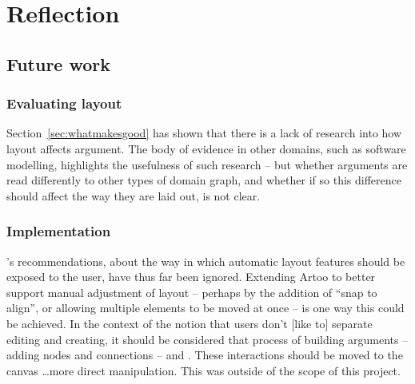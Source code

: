 \chapter{Reflection}


\section{Future work}

\subsection{Evaluating layout}

Section~\ref{sec:whatmakesgood} has shown that there is a lack of research into how layout affects argument. The body of evidence in other domains, such as software modelling, highlights the usefulness of such research -- but whether arguments are read differently to other types of domain graph, and whether if so this difference should affect the way they are laid out, is not clear.



\subsection{Implementation}

\citet{5674033}'s recommendations, about the way in which automatic layout features should be exposed to the user, have thus far been ignored. Extending Artoo to better support manual adjustment of layout -- perhaps by the addition of ``snap to align'', or allowing multiple elements to be moved at once -- is one way this could be achieved. In the context of the notion that users don't [like to] separate editing and creating, it should be considered that process of building arguments -- adding nodes and connections -- and  . These interactions should be moved to the canvas \ldots more direct manipulation. This was outside of the scope of this project.

